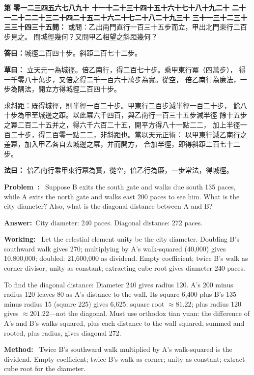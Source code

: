\documentclass[9pt,a4paper]{article}
\newcounter{probnum}
\newcounter{overallnum}
\newcommand{\chnum}[1]{%
  \ifcase#1 零\or 一\or 二\or 三\or 四\or 五\or 六\or 七\or 八\or 九\or 十\or
    十一\or 十二\or 十三\or 十四\or 十五\or 十六\or 十七\or 十八\or 十九\or 二十\or
    二十一\or 二十二\or 二十三\or 二十四\or 二十五\or 二十六\or 二十七\or 二十八\or 二十九\or 三十\or
    三十一\or 三十二\or 三十三\or 三十四\or 三十五\fi}
\newcommand{\problem}[1]{\stepcounter{probnum}\stepcounter{overallnum}\par\noindent\textbf{\color{volcolor}第\chnum{\value{probnum}}問：}#1\par\vspace{0.15cm}}
\newcommand{\answer}[1]{\par\noindent\textbf{答曰：}#1\par\vspace{0.15cm}}
\newcommand{\working}[1]{\par\noindent\textbf{草曰：}#1\par\vspace{0.15cm}}
\newcommand{\method}[1]{\par\noindent\textbf{法曰：}#1\par\vspace{0.25cm}}
\newcommand{\eproblem}[1]{\par\noindent\textbf{\color{volcolor}Problem~\theoverallnum:}~#1\par\vspace{0.15cm}}
\newcommand{\eanswer}[1]{\par\noindent\textbf{Answer:}~#1\par\vspace{0.15cm}}
\newcommand{\eworking}[1]{\par\noindent\textbf{Working:}~#1\par\vspace{0.15cm}}
\newcommand{\emethod}[1]{\par\noindent\textbf{Method:}~#1\par\vspace{0.25cm}}
\begin{document}
\noindent\begin{minipage}[t]{0.48\textwidth}
\problem{
或問：乙出南門直行一百三十五步而立，甲出北門東行二百步見之。
問城徑幾何？又問甲乙相望之斜距幾何？
}

\answer{城徑二百四十步。斜距二百七十二步。}

\working{
立天元一為城徑。倍乙南行，得二百七十步。乘甲東行冪（四萬步），
得一千零八十萬步，又倍之得二千一百六十萬步為實。從空，
倍乙南行為廉法，一步為隅法，開立方得城徑二百四十步。

求斜距：既得城徑，則半徑一百二十步。甲東行二百步減半徑一百二十步，
餘八十步為甲至城邊之距。以此冪六千四百，與乙南行一百三十五步減半徑
餘十五步之冪二百二十五并之，得六千六百二十五，開平方得八十一點二二，
加上半徑一百二十步，得二百零一點二二，非斜距也。當以天元正術：
以甲東行減乙南行之差冪，加入甲乙各自去城邊之冪，并而開方，
合加半徑，即得斜距二百七十二步。
}

\method{
倍乙南行乘甲東行冪為實，從空，倍乙行為廉，一步常法，得城徑。
}
\end{minipage}%
\hfill%
\begin{minipage}[t]{0.50\textwidth}
\eproblem{
Suppose B exits the south gate and walks due south 135 paces, while A exits
the north gate and walks east 200 paces to see him. What is the city diameter?
Also, what is the diagonal distance between A and B?
}

\eanswer{City diameter: 240 paces. Diagonal distance: 272 paces.}

\eworking{
Let the celestial element unity be the city diameter. Doubling B's southward
walk gives 270; multiplying by A's walk-squared (40,000) gives 10,800,000;
doubled: 21,600,000 as dividend. Empty coefficient; twice B's walk as corner
divisor; unity as constant; extracting cube root gives diameter 240 paces.

To find the diagonal distance: Diameter 240 gives radius 120. A's 200 minus
radius 120 leaves 80 as A's distance to the wall. Its square 6,400 plus B's
135 minus radius 15 (square 225) gives 6,625; square root $\approx 81.22$;
plus radius 120 gives $\approx 201.22$---not the diagonal. Must use orthodox
tian yuan: the difference of A's and B's walks squared, plus each distance
to the wall squared, summed and rooted, plus radius, gives diagonal 272.
}

\emethod{
Twice B's southward walk multiplied by A's walk-squared is the dividend.
Empty coefficient; twice B's walk as corner; unity as constant;
extract cube root for the diameter.
}
\end{minipage}
\vspace{0.15cm}
\end{document}
